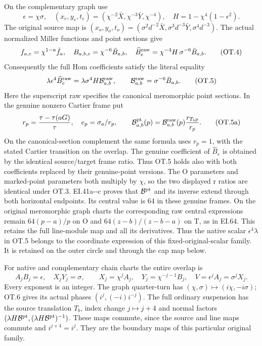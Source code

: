 On the complementary graph use
\[
\epsilon=\chi\sigma,\quad
(x_e,y_e,t_e)=(\chi^{-2}\bar X,\chi^{-3}\bar Y,\chi^{-4}),
\quad H=1-\chi^4(1-\epsilon^2).
                                                               \tag{OT.3}
\]
The original source map is
\((x_o,y_o,t_o)=(\sigma^2d^{-2}\bar X,
\sigma^3d^{-3}\bar Y,\sigma^4d^{-3})\).
The actual normalized Miller functions and point sections give
\[
f_{a,e}=\chi^{1-a}\bar f_a,\quad
B_{a,b,e}=\chi^{-6}\bar B_{a,b},\quad
\widehat B_e^{\rm raw}=\chi^{-4}H\,\sigma^{-6}\bar B_{a,b}.
                                                               \tag{OT.4}
\]
Consequently the full Hom coefficients satisfy the literal equality
\[
\lambda\epsilon^4\widehat B_e^{\rm raw}
 =\lambda\sigma^4H\mathcal B_{a,b}^{\rm raw},\qquad
\mathcal B_{a,b}^{\rm raw}=\sigma^{-6}\bar B_{a,b}.       \tag{OT.5}
\]
Here the superscript raw specifies the canonical meromorphic point
sections. In the genuine nonzero Cartier frame put
\[
r_p=\frac{\tau-\tau(aG)}{\tau},\quad
e_p=\sigma_a/r_p,\qquad
\mathcal B_{a,b}^{\rm pt}(p)
  =\mathcal B_{a,b}^{\rm raw}(p)\frac{r_{T_bp}}{r_p}.
                                                               \tag{OT.5a}
\]
On the canonical-section complement the same formula uses \(r_p=1\),
with the stated Cartier transition on the overlap. The genuine
coefficient of \(\widehat B_e\) is obtained by the identical
source/target frame ratio. Thus OT.5 holds also with both
coefficients replaced by their genuine-point versions. The O
parameters and marked-point parameters both multiply by \(\chi\),
so the two displayed r ratios are identical under OT.3.
EI.41a-\/-c proves that \(\mathcal B^{\rm pt}\) and its inverse
extend through both horizontal endpoints. Its central value is
64 in these genuine frames. On the original meromorphic graph
charts the corresponding raw central expressions remain
\(64(p-a)/p\) on O and \(64(z-b)/(z-b-a)\) on T, as in EI.64.
This retains the full line-module map and all its derivatives.
Thus the native scalar
\(\epsilon^4\lambda\) in OT.5 belongs to the coordinate expression
of this fixed-original-scalar family. It is retained on the outer
circle and through the cap map below.

For native and complementary chain charts the entire overlap is
\[
A_jB_j=\epsilon,\quad X_jY_j=\sigma,\qquad
X_j=\chi^jA_j,\quad Y_j=\chi^{-j-1}B_j,
\quad V=\epsilon^jA_j=\sigma^jX_j.                     \tag{OT.6}
\]
Every exponent is an integer. The graph quarter-turn has
\((\chi,\sigma)\mapsto(i\chi,-i\sigma)\); OT.6 gives its
actual phases \((i^j,(-i)i^{-j})\). The full ordinary suspension
has the source translation \(T_b\), index change \(j\mapsto j+4\)
and normal factors
\((\lambda H\mathcal B^{\rm pt},(\lambda H\mathcal B^{\rm pt})^{-1})\).
These maps commute, since the source and line maps commute and
\(i^{j+4}=i^j\). They are the boundary maps of this particular
original family.

